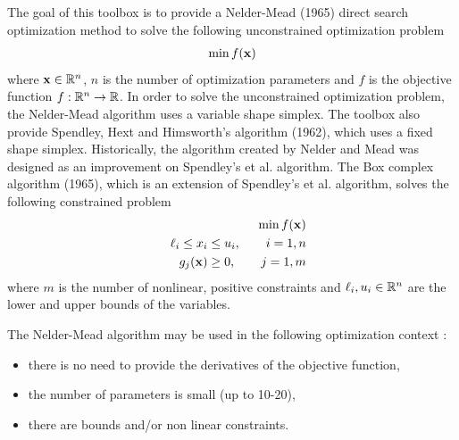 The goal of this toolbox is to provide a Nelder-Mead (1965) direct search optimization method to solve the 
following unconstrained optimization problem
\begin{eqnarray}
\min f(\mathbf{x})
\end{eqnarray}
where $\mathbf{x}\in \mathbb{R}^n$, $n$ is the number of optimization parameters and $f$ is the objective 
function $f:\mathbb{R}^n\rightarrow \mathbb{R}$.
In order to solve the unconstrained optimization problem, the Nelder-Mead 
algorithm uses a variable shape simplex. The toolbox also provide Spendley, Hext and Himsworth's  
algorithm \cite{Spendley1962} (1962), which uses a fixed shape simplex. Historically, the algorithm created  
by Nelder and Mead was designed as an improvement on Spendley's et al. algorithm.
The Box complex algorithm \cite{Box1965} (1965), which is an extension of Spendley's  et al. algorithm, solves the 
following constrained problem
\begin{eqnarray}
&&\min f(\mathbf{x})\\
&&\ell_i \leq x_i \leq u_i, \qquad i = 1,n\\
&&g_j(\mathbf{x})\geq 0, \qquad j = 1, m\\
\end{eqnarray}
where $m$ is the number of nonlinear, positive constraints and $\ell_i,u_i\in \mathbb{R}^n$ are the lower 
and upper bounds of the variables.

The Nelder-Mead algorithm may be used in the following optimization context :
\begin{itemize}
\item there is no need to provide the derivatives of the objective function,
\item the number of parameters is small (up to 10-20),
\item there are bounds and/or non linear constraints.
\end{itemize}


